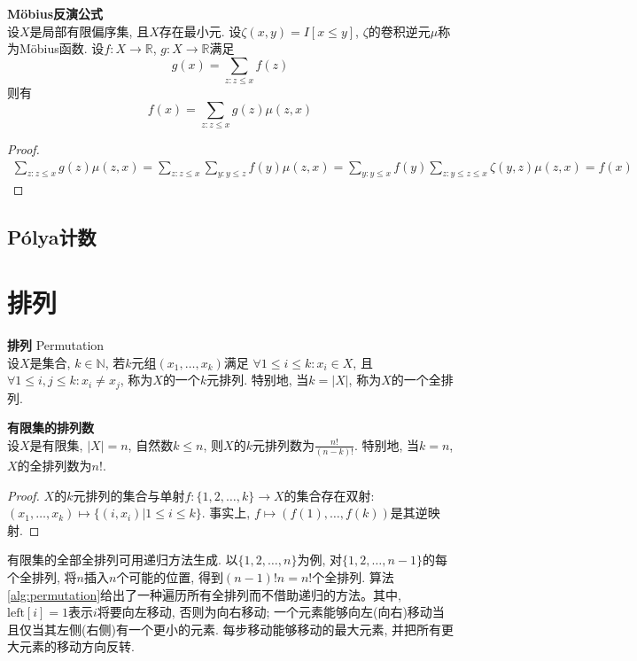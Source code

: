 \begin{thm} \textbf{Möbius反演公式}\\
设$X$是局部有限偏序集, 且$X$存在最小元. 设$\zeta(x,y)=I[x\le y]$, $\zeta$的卷积逆元$\mu$称为Möbius函数. 设$f:X\to \mathbb{R}$, $g:X\to \mathbb{R}$满足
\begin{equation}
    g(x) = \sum_{z:z\le x} f(z)
\end{equation}
则有
\begin{equation}
    f(x) = \sum_{z:z\le x} g(z)\mu(z,x)
\end{equation}
\end{thm}
\begin{proof}
\begin{align*}
    \sum_{z:z\le x} g(z)\mu(z,x) = \sum_{z:z\le x} \sum_{y:y\le z} f(y)\mu(z,x)
    = \sum_{y:y\le x} f(y) \sum_{z:y\le z\le x} \zeta(y,z)\mu(z,x)=f(x)
\end{align*}
\end{proof}

\subsection{Pólya计数}

\section{排列}

\begin{dfn} \textbf{排列} Permutation\\
设$X$是集合, $k\in \mathbb{N}$, 若$k$元组$(x_1,\dots,x_k)$满足 $\forall 1\le i \le k: x_i\in X$, 且$\forall 1\le i,j \le k: x_i\neq x_j$, 称为$X$的一个$k$元排列. 特别地, 当$k=|X|$, 称为$X$的一个全排列. 
\end{dfn}

\begin{col} \textbf{有限集的排列数}\\
设$X$是有限集, $|X|=n$, 自然数$k\le n$, 则$X$的$k$元排列数为$\frac{n!}{(n-k)!}$. 特别地, 当$k=n$, $X$的全排列数为$n!$. 
\end{col}
\begin{proof}
$X$的$k$元排列的集合与单射$f:\{1,2,\dots, k\}\to X$的集合存在双射: $(x_1,\dots,x_k)\mapsto \{(i,x_i)\vert 1\le i\le k\}$. 事实上, $f\mapsto (f(1),\dots, f(k))$是其逆映射. 
\end{proof}

\par 有限集的全部全排列可用递归方法生成. 以$\{1,2,\dots,n\}$为例, 对$\{1,2,\dots,n-1\}$的每个全排列, 将$n$插入$n$个可能的位置, 得到$(n-1)! n = n!$个全排列. 算法\ref{alg:permutation}给出了一种遍历所有全排列而不借助递归的方法。其中, $\mathrm{left}[i]=1$表示$i$将要向左移动, 否则为向右移动; 一个元素能够向左(向右)移动当且仅当其左侧(右侧)有一个更小的元素. 每步移动能够移动的最大元素, 并把所有更大元素的移动方向反转. 

